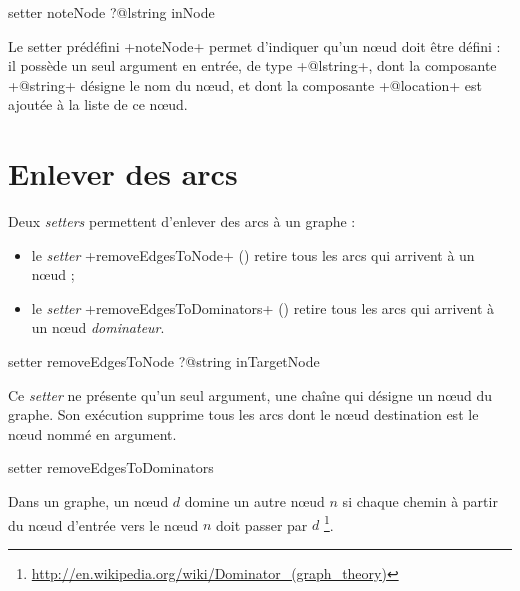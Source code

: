 
\begin{galgas3}
setter noteNode ?@lstring inNode
\end{galgas3}

Le setter prédéfini \ggst+noteNode+ permet d'indiquer qu'un nœud doit être défini : il possède un seul argument en entrée, de type \ggst+@lstring+, dont la composante \ggst+@string+ désigne le nom du nœud, et dont la composante \ggst+@location+ est ajoutée à la liste de ce nœud.



\section{Enlever des arcs}

Deux \emph{setters} permettent d'enlever des arcs à un graphe :
\begin{itemize}
  \item le \emph{setter} \ggst+removeEdgesToNode+ () retire tous les arcs qui arrivent à un nœud ;
  \item le \emph{setter} \ggst+removeEdgesToDominators+ () retire tous les arcs qui arrivent à un nœud \emph{dominateur}.
\end{itemize}




\begin{galgas3}
setter removeEdgesToNode ?@string inTargetNode
\end{galgas3}

Ce \emph{setter} ne présente qu'un seul argument, une chaîne qui désigne un nœud du graphe. Son exécution supprime tous les arcs dont le nœud destination est le nœud nommé en argument.


\begin{galgas3}
setter removeEdgesToDominators
\end{galgas3}

Dans un graphe, un nœud $d$ domine un autre nœud $n$ si chaque chemin à partir du nœud d'entrée vers le nœud $n$ doit passer par $d$ \footnote{\url{http://en.wikipedia.org/wiki/Dominator_(graph_theory)}}.

